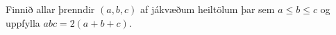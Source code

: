 Finnið allar þrenndir $(a,b,c)$ af jákvæðum heiltölum þar sem $a \le b \le c$ og uppfylla $abc=2(a+b+c)$.